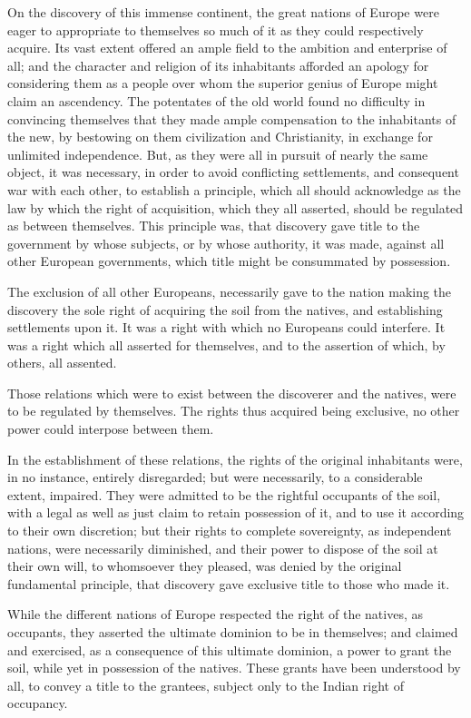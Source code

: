 On the discovery of this immense continent, the great nations of Europe were
eager to appropriate to themselves so much of it as they could respectively
acquire. Its vast extent offered an ample field to the ambition and enterprise
of all; and the character and religion of its inhabitants afforded an apology
for considering them as a people over whom the superior genius of Europe might
claim an ascendency. The potentates of the old world found no difficulty in
convincing themselves that they made ample compensation to the inhabitants of
the new, by bestowing on them civilization and Christianity, in exchange for
unlimited independence. But, as they were all in pursuit of nearly the same
object, it was necessary, in order to avoid conflicting settlements, and
consequent war with each other, to establish a principle, which all should
acknowledge as the law by which the right of acquisition, which they all
asserted, should be regulated as between themselves. This principle was, that
discovery gave title to the government by whose subjects, or by whose authority,
it was made, against all other European governments, which title might be
consummated by possession.

The exclusion of all other Europeans, necessarily gave to the nation making the
discovery the sole right of acquiring the soil from the natives, and
establishing settlements upon it. It was a right with which no Europeans could
interfere. It was a right which all asserted for themselves, and to the
assertion of which, by others, all assented.

Those relations which were to exist between the discoverer and the natives, were
to be regulated by themselves. The rights thus acquired being exclusive, no
other power could interpose between them.

In the establishment of these relations, the rights of the original inhabitants
were, in no instance, entirely disregarded; but were necessarily, to a
considerable extent, impaired. They were admitted to be the rightful occupants
of the soil, with a legal as well as just claim to retain possession of it, and
to use it according to their own discretion; but their rights to complete
sovereignty, as independent nations, were necessarily diminished, and their
power to dispose of the soil at their own will, to whomsoever they pleased, was
denied by the original fundamental principle, that discovery gave exclusive
title to those who made it.

While the different nations of Europe respected the right of the natives, as
occupants, they asserted the ultimate dominion to be in themselves; and claimed
and exercised, as a consequence of this ultimate dominion, a power to grant the
soil, while yet in possession of the natives. These grants have been understood
by all, to convey a title to the grantees, subject only to the Indian right of
occupancy.

